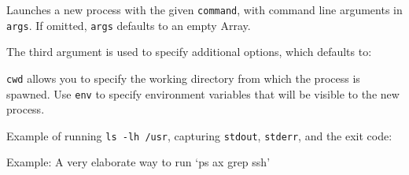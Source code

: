 Launches a new process with the given \texttt{command}, with command
line arguments in \texttt{args}. If omitted, \texttt{args} defaults to
an empty Array.

The third argument is used to specify additional options, which defaults
to:

\begin{Shaded}
\begin{Highlighting}[]
\NormalTok{\{ }
  \NormalTok{: }
\NormalTok{\}}
\end{Highlighting}
\end{Shaded}

\texttt{cwd} allows you to specify the working directory from which the
process is spawned. Use \texttt{env} to specify environment variables
that will be visible to the new process.

Example of running \texttt{ls -lh /usr}, capturing \texttt{stdout},
\texttt{stderr}, and the exit code:

\begin{Shaded}
\begin{Highlighting}[]
 \NormalTok{,}
    \NormalTok{, [}\NormalTok{, }\NormalTok{]);}

\NormalTok{(}\NormalTok{, } 
  \NormalTok{(} 
\NormalTok{\});}

\NormalTok{(}\NormalTok{, } 
  \NormalTok{(} 
\NormalTok{\});}

\NormalTok{(}\NormalTok{, } 
  \NormalTok{(} 
\NormalTok{\});}
\end{Highlighting}
\end{Shaded}

Example: A very elaborate way to run `ps ax \textbar{} grep ssh'

